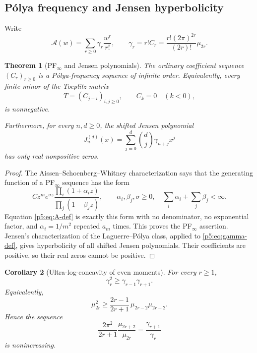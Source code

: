 \documentclass[11pt]{article}
\numberwithin{equation}{section}
\newtheorem{theorem}{Theorem}[section]
\newtheorem{corollary}[theorem]{Corollary}
\theoremstyle{definition}
\theoremstyle{remark}
\begin{document}
\subsection{P\'olya frequency and Jensen hyperbolicity}

Write
\begin{equation}\label{p5:eq:gamma-def}
 \mathcal A(w)=\sum_{r\ge0}\gamma_r\frac{w^r}{r!},
 \qquad
 \gamma_r=r!C_r
 =\frac{r!(2\pi)^{2r}}{(2r)!}\mu_{2r}.
\end{equation}

\begin{theorem}[PF$_\infty$ and Jensen polynomials]\label{p5:thm:PF-Jensen}
The ordinary coefficient sequence $(C_r)_{r\ge0}$ is a P\'olya-frequency
sequence of infinite order.  Equivalently, every finite minor of the Toeplitz
matrix
\begin{equation}\label{p5:eq:Toeplitz}
 T=(C_{j-i})_{i,j\ge0},\qquad C_k=0\quad(k<0),
\end{equation}
is nonnegative.

Furthermore, for every $n,d\ge0$, the shifted Jensen polynomial
\begin{equation}\label{p5:eq:Jensen}
 J_n^{(d)}(x)=\sum_{j=0}^{d}\binom dj\gamma_{n+j}x^j
\end{equation}
has only real nonpositive zeros.
\end{theorem}

\begin{proof}
The Aissen--Schoenberg--Whitney characterization says that the generating
function of a PF$_\infty$ sequence has the form
\[
 Cz^me^{\sigma z}\frac{\prod_i(1+\alpha_i z)}
 {\prod_j(1-\beta_jz)},
 \qquad \alpha_i,\beta_j,\sigma\ge0,
 \quad \sum_i\alpha_i+\sum_j\beta_j<\infty.
\]
Equation \cref{p5:eq:A-def} is exactly this form with no denominator, no
exponential factor, and $\alpha_i=1/m^2$ repeated $a_m$ times.  This proves the
PF$_\infty$ assertion.  Jensen's characterization of the Laguerre--P\'olya
class, applied to \cref{p5:eq:gamma-def}, gives hyperbolicity of all shifted
Jensen polynomials.  Their coefficients are positive, so their real zeros
cannot be positive.
\end{proof}

\begin{corollary}[Ultra-log-concavity of even moments]\label{p5:cor:moment-turan}
For every $r\ge1$,
\begin{equation}\label{p5:eq:gamma-turan}
 \gamma_r^2\ge\gamma_{r-1}\gamma_{r+1}.
\end{equation}
Equivalently,
\begin{equation}\label{p5:eq:mu-turan}
 \boxed{
 \mu_{2r}^2\ge
 \frac{2r-1}{2r+1}\,\mu_{2r-2}\mu_{2r+2}.}
\end{equation}
Hence the sequence
\begin{equation}\label{p5:eq:ratio-monotone}
 \frac{2\pi^2}{2r+1}\frac{\mu_{2r+2}}{\mu_{2r}}
 =\frac{\gamma_{r+1}}{\gamma_r}
\end{equation}
is nonincreasing.
\end{corollary}
\end{document}
